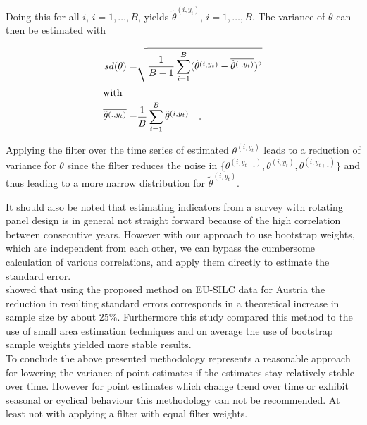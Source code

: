 \documentclass{scrartcl}\usepackage[]{graphicx}\usepackage[]{color}
\begin{document}
Doing this for all $i$, $i=1,\ldots,B$, yields $\tilde{\theta}^{(i,y_t)}$, $i=1,\ldots,B$. The variance of $\theta$ can then be estimated with

\begin{align*}
  sd(\theta) =& \sqrt{\frac{1}{B-1}\sum\limits_{i=1}^B (\tilde{\theta}^{(i,y_t)}-\overline{\tilde{\theta}^{(.,y_t)}})^2}\\
  \intertext{with}
  \overline{\tilde{\theta}^{(.,y_t)}}=&\frac{1}{B}\sum\limits_{i=1}^B\tilde{\theta}^{(i,y_t)} \quad.
\end{align*}

Applying the filter over the time series of estimated $\theta^{(i,y_t)}$ leads to a reduction of variance for $\theta$ since the filter reduces the noise in $\{\theta^{(i,y_{t-1})},\theta^{(i,y_t)},\theta^{(i,y_{t+1})}\}$ and thus leading to a more narrow distribution for $\tilde{\theta}^{(i,y_t)}$.

It should also be noted that estimating indicators from a survey with rotating panel design is in general not straight forward because of the high correlation between consecutive years. However with our approach to use bootstrap weights, which are independent from each other, we can bypass the cumbersome calculation of various correlations, and apply them directly to estimate the standard error.\\
\citep{silcstudy} showed that using the proposed method on EU-SILC data for Austria the reduction in resulting standard errors corresponds in a theoretical increase in sample size by about 25$\%$. Furthermore this study compared this method to the use of small area estimation techniques and on average the use of bootstrap sample weights yielded more stable results.\\
To conclude the above presented methodology represents a reasonable approach for lowering the variance of point estimates if the estimates stay relatively stable over time. However for point estimates which change trend over time or exhibit seasonal or cyclical behaviour this methodology can not be recommended. At least not with applying a filter with equal filter weights.

\newpage

\end{document}
